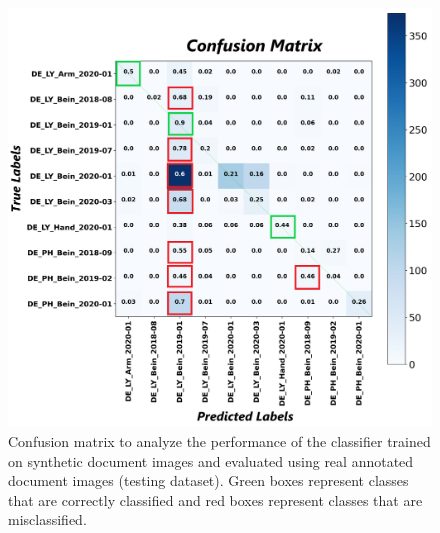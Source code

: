 \begin{figure}[H]
    \begin{center}
	\includegraphics[scale=0.20]{images/Evaluation/Confusion_Matrix_Synthetic_Data_Classifier_2021-05-31_16-40-33.png}
	\caption[Confusion matrix to analyze the performance of the classifier trained on synthetic document images and evaluated using real annotated document images (test dataset).]{Confusion matrix to analyze the performance of the classifier trained on synthetic document images and evaluated using real annotated document images (testing dataset). Green boxes represent classes that are correctly classified and red boxes represent classes that are misclassified.}
	\label{fig:CMSyntheticDocumentImagesClassifier}
	\end{center}
\end{figure}

